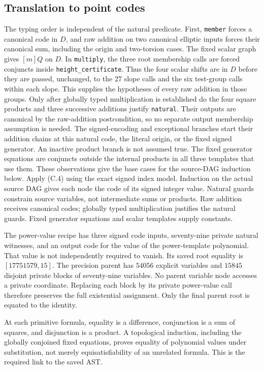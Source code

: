 \subsection{Translation to point codes}
The typing order is independent of the natural predicate. First,
\texttt{member} forces a canonical code in $D$, and raw addition on two
canonical elliptic inputs forces their canonical sum, including the
origin and two-torsion cases. The fixed scalar graph gives $[m]Q$ on
$D$. In \texttt{multiply}, the three root membership calls are forced
conjuncts inside \texttt{height\_certificate}. Thus the four scalar shifts
are in $D$ before they are passed, unchanged, to the 27 slope calls and
the six test-group calls within each slope. This supplies the hypotheses
of every raw addition in those groups. Only after globally typed
multiplication is established do the four square products and three
successive additions justify \texttt{natural}. Their outputs are canonical
by the raw-addition postcondition, so no separate output membership
assumption is needed. The signed-encoding and exceptional branches start
their addition chains at this natural code, the literal origin, or the
fixed signed generator. An inactive product branch is not assumed true.
The fixed generator equations are conjuncts outside the internal products
in all three templates that use them. These observations give the base
cases for the source-DAG induction below.
Apply (C.4) using the exact signed index model. Induction on the actual
source DAG gives each node the code of its signed integer value.
Natural guards constrain source variables, not intermediate sums or
products. Raw addition receives canonical codes; globally typed
multiplication justifies the natural guards. Fixed generator equations
and scalar templates supply constants.

The power-value recipe has three signed code inputs, seventy-nine
private natural witnesses, and an output code for the value of the
power-template polynomial. That value is not independently required
to vanish. Its saved root equality is $[17751579,15]$.
The precision parent has $54056$ explicit variables and $15845$
disjoint private blocks of seventy-nine variables. No parent variable
node accesses a private coordinate. Replacing each block by its
private power-value call therefore preserves the full existential
assignment. Only the final parent root is equated to the identity.

At each primitive formula, equality is a difference, conjunction is
a sum of squares, and disjunction is a product. A topological induction,
including the globally conjoined fixed equations, proves equality of
polynomial values under substitution, not merely equisatisfiability
of an unrelated formula. This is the required link to the saved AST.

